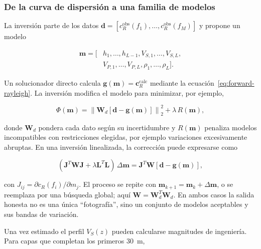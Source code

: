 \subsubsection{De la curva de dispersión a una familia de modelos}

La inversión parte de los datos
$\boldsymbol{d}=[c_R^{\mathrm{obs}}(f_1),\ldots,c_R^{\mathrm{obs}}(f_M)]$ y propone un
modelo

\begin{equation}
\begin{split}
    \boldsymbol{m}=[&h_1,\ldots,h_{L-1},
    V_{S,1},\ldots,V_{S,L},\\
    &V_{P,1},\ldots,V_{P,L},
    \rho_1,\ldots,\rho_L].
\end{split}
\end{equation}

Un solucionador directo calcula
$\boldsymbol{g}(\boldsymbol{m})=\boldsymbol{c}_R^{\mathrm{calc}}$ mediante la
ecuación~\eqref{eq:forward-rayleigh}. La inversión modifica el modelo para minimizar,
por ejemplo,

\begin{equation}
    \Phi(\boldsymbol{m})=
    \left\|\boldsymbol{W}_d
    [\boldsymbol{d}-\boldsymbol{g}(\boldsymbol{m})]\right\|_2^2
    +\lambda\,R(\boldsymbol{m}),
    \label{eq:objetivo-inversion}
\end{equation}

donde $\boldsymbol{W}_d$ pondera cada dato según su incertidumbre y
$R(\boldsymbol{m})$ penaliza modelos incompatibles con restricciones elegidas, por
ejemplo variaciones excesivamente abruptas. En una inversión linealizada, la corrección
puede expresarse como

\begin{equation}
    (\boldsymbol{J}^{T}\boldsymbol{W}\boldsymbol{J}+\lambda\boldsymbol{L}^{T}
    \boldsymbol{L})\,\Delta\boldsymbol{m}
    =\boldsymbol{J}^{T}\boldsymbol{W}
    [\boldsymbol{d}-\boldsymbol{g}(\boldsymbol{m})],
\end{equation}

con $J_{ij}=\partial c_R(f_i)/\partial m_j$. El proceso se repite con
$\boldsymbol{m}_{k+1}=\boldsymbol{m}_k+\Delta\boldsymbol{m}$, o se reemplaza por una
búsqueda global; aquí $\boldsymbol{W}=\boldsymbol{W}_d^T\boldsymbol{W}_d$. En ambos
casos la salida honesta no es una única ``fotografía'', sino
un conjunto de modelos aceptables y sus bandas de variación.

Una vez estimado el perfil $V_S(z)$ pueden calcularse magnitudes de ingeniería. Para
capas que completan los primeros \SI{30}{\meter},

